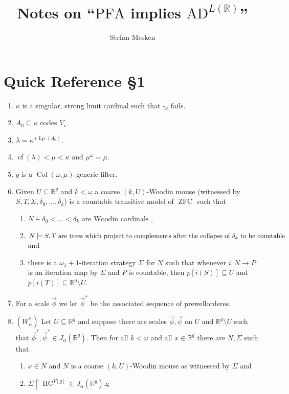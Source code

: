 \documentclass[12pt,a4paper]{article}
\theoremstyle{nicestyle}
\DeclareMathOperator{\Col}{Col}
\DeclareMathOperator{\HC}{HC}
\DeclareMathOperator{\zfc}{ZFC}
\DeclareMathOperator{\cf}{cf}
\DeclareMathOperator{\Lp}{Lp}
\begin{document}
\author{Stefan Mesken}
\title{Notes on ``$\mathrm{PFA}$ implies $\mathrm{AD}^{L(\mathbb{R})}$''}
\maketitle

\section{Quick Reference \S 1}
\begin{enumerate}
\item $\kappa$ is a singular, strong limit cardinal such that $\square_{\kappa}$ fails. 
\item $A_0 \subseteq \kappa$ codes $V_{\kappa}$.
\item $\lambda = \kappa^{+ \Lp(A_{0})}$.
\item $\cf(\lambda) < \mu < \kappa$ and $\mu^{\omega} = \mu$.
\item $g$ is a $\Col(\omega,\mu)$-generic filter.
\item Given $U \subseteq \mathbb{R}^g$ and $k < \omega$ a coarse
  $(k, U)$-Woodin mouse (witnessed by
  $S, T, \Sigma, \delta_0, \ldots, \delta_k$) is a countable
  transitive model of $\zfc$ such that
  \begin{enumerate}
  \item
    $N \models \delta_0 < \ldots < \delta_k \text{ are Woodin
      cardinals}$ ,
  \item
    $N \models S,T \text{ are trees which project to complements after
      the collapse } \\ \text{of } \delta_k \text{ to be countable}$ and
  \item there is a $\omega_1+1$-iteration strategy $\Sigma$ for $N$
    such that whenever $i \colon N \to P$ is an iteration map by
    $\Sigma$ and $P$ is countable, then $p[i(S)] \subseteq U$ and
    $p[i(T)] \subseteq \mathbb{R}^g \setminus U$.
  \end{enumerate}
\item For a scale $\vec{\phi}$ we let $\vec{\phi}^{*}$ be the
  associated sequence of prewellorderes.
\item $(W_{\alpha}^{*})$ Let $U \subseteq \mathbb{R}^g$ and suppose
  there are scales $\vec{\phi}, \vec{\psi}$ on $U$ and
  $\mathbb{R}^g \setminus U$ such that
  $\vec{\phi}^{*}, \vec{\psi}^{*} \in
  J_{\alpha}(\mathbb{R}^{g})$. Then for all $k < \omega$ and all
  $x \in \mathbb{R}^g$ there are $N, \Sigma$ such that
  \begin{enumerate}
  \item $x \in N$ and $N$ is a coarse $(k,U)$-Woodin mouse as
    witnessed by $\Sigma$ and
  \item $\Sigma \restriction \HC^{V[g]} \in J_{\alpha}(\mathbb{R}^{g})$.g
  \end{enumerate}

\end{enumerate}

% 
% 
\end{document}

